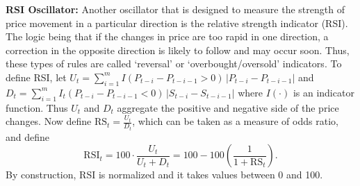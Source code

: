 \noindent\textbf{RSI Oscillator:} Another oscillator that is designed to measure the strength of price movement in a particular direction is the relative strength indicator (RSI). The logic being that if the changes in price are too rapid in one direction, a correction in the opposite direction is likely to follow and may occur soon. Thus, these types of rules are called `reversal' or `overbought/oversold' indicators. To define RSI, let $U_{t} = \sum_{i=1}^m I(P_{t-i} - P_{t-i-1} > 0)\,\lvert P_{t-i} - P_{t-i-1} \rvert$ and $D_{t} = \sum_{i=1}^m I_{t} (P_{t-i} - P_{t-i-1} < 0)\,\lvert S_{t-i} - S_{t-i-1}\rvert$ where $I(\cdot)$ is an indicator function. Thus $U_t$ and $D_t$ aggregate the positive and negative side of the price changes. Now define $\text{RS}_{t} = \frac {U_{t}}{D_{t}}$, which can be taken as a measure of odds ratio, and define
	\begin{equation} \label{eqn:rsi}
	\text{RSI}_{t} = 100 \cdot \frac{U_{t}}{U_{t} + D_{t}} = 100 - 100 \left( \dfrac{1}{1 + \text{RS}_t} \right).
	\end{equation}
By construction, RSI is normalized and it takes values between 0 and 100. \medbreak


\begin{center}
\noindent{}
\end{center} \twomedskip


